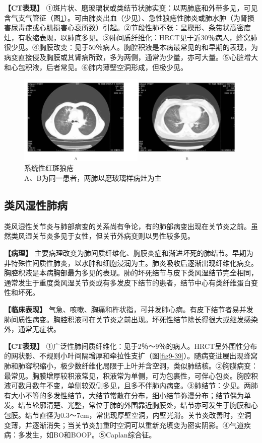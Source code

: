 \textbf{【CT表现】}
①斑片状、磨玻璃状或类结节状肺实变：以两肺底和外带多见，可见含气支气管征（图\ref{fig9-38}）。可由肺炎出血（少见）、急性狼疮性肺炎或肺水肿（为肾损害尿毒症或心肌损害心衰所致）引起。②节段性肺不张：呈楔形、条带状高密度灶，有收缩表现，以肺底多见。③肺间质纤维化：HRCT见于近30％病人，蜂窝肺很少见。④胸膜改变：见于50％病人。胸腔积液是本病最常见的和早期的表现，为病变直接侵及胸膜或其肾病所致，多为两侧，通常为少量，亦可大量。⑤心脏增大和心包积液，后者常见。⑥肺内薄壁空洞形成，但极少见。

\begin{figure}[!htbp]
 \centering
 \includegraphics[width=.7\textwidth,height=\textheight,keepaspectratio]{./images/Image00229.jpg}
 \captionsetup{justification=centering}
 \caption{系统性红斑狼疮\\{\small A、B为同一患者，两肺以磨玻璃样病灶为主}}
 \label{fig9-38}
  \end{figure} 

\subsection{类风湿性肺病}

类风湿性关节炎与肺部病变的关系尚有争论，有的肺部病变出现在关节炎之前。虽然类风湿关节炎多见于女性，但关节外病变则以男性较多见。

\textbf{【病理】}
主要病理改变为肺间质纤维化、胸膜炎症和渐进坏死的肺结节。早期为非特殊性间质性肺炎，以水肿和细胞浸润为主。肺炎吸收后逐渐出现纤维化病变。胸腔积液是本病胸部最为多见的表现。肺的坏死结节与皮下类风湿结节完全相同，通常发生于重度类风湿关节炎或有多发皮下结节的患者，结节中心有类纤维蛋白变性和坏死。

\textbf{【临床表现】}
气急、咳嗽、胸痛和杵状指，可并发肺心病。有皮下结节者易并发肺间质性病变。胸腔积液可在关节炎之前出现。坏死性结节除长得很大或继发感染外，通常无症状。

\textbf{【CT表现】}
①广泛性肺间质纤维化：见于2％～9％的病人。HRCT呈外围性分布的网状影、不规则小叶间隔增厚和牵拉性支扩（图\ref{fig9-39}）。随病变进展出现蜂窝肺和肺容积缩小，极少数纤维化局限于上叶并含空洞，类似肺结核。②胸膜病变：最常见。胸膜增厚较积液常见，积液常为单侧，可为包裹性，可伴心包炎。胸腔积液可数月数年不变，单侧较双侧多见，且多不伴肺内病变。③肺结节：少见。两肺有大小不等的多发性结节，大结节常散在分布，细小结节弥漫分布；结节偶为单发。结节轮廓清楚、光整，常位于肺的外围靠近胸膜处，结节亦可发生于胸膜和心包膜。结节直径为0.3～7cm，常出现厚壁空洞，内壁光滑。关节炎改善时，空洞变薄，并逐渐消失；当关节炎加重时空洞可以重新充填变为密实阴影。④气道疾病：多发生，如BO和BOOP。⑤Caplan综合征。

